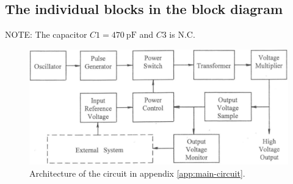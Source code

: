 \subsection{The individual blocks in the block diagram}

NOTE: The capacitor $C1 = \SI{470}{\pico\farad}$ and $C3$ is N.C.

\begin{figure}[H]
\centering
\includegraphics[width=.9\textwidth]{figures/block-diagram.png}
\caption{Architecture of the circuit in appendix \ref{app:main-circuit}.}
\label{fig:1:architecture}
\end{figure}




